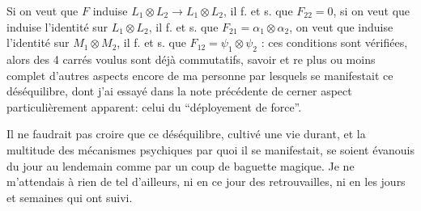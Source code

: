 Si on veut que $F$ induise  $L_1\otimes L_2\longrightarrow L_1\otimes L_2$, il f. et s.  que $\boxed{F_{22}=0}$, si on veut  que  induise l'identité sur $L_1\otimes L_2$, il f. et s. que $\boxed{F_{21}=\alpha_1\otimes\alpha_2}$,   on veut que  induise l'identité sur $M_1\otimes M_2$, il f. et s. que $\boxed{F_{12}=\psi_1\otimes\psi_2}$ :  ces conditions sont vérifiées, alors  des 4 carrés voulus sont déjà commutatifs, savoir
et
re plus ou moins complet d'autres aspects encore de ma personne par lesquels se manifestait ce déséquilibre, dont j'ai essayé dans la note précédente de cerner aspect particulièrement apparent: celui du ``déployement de force''.

Il ne faudrait pas croire que ce déséquilibre, cultivé une vie durant, et la multitude des mécanismes psychiques par quoi il se manifestait, se soient évanouis du jour au lendemain comme par un coup de baguette magique. Je ne m'attendais à rien de tel d'ailleurs, ni en ce jour des retrouvailles, ni en les jours et semaines qui ont suivi.

